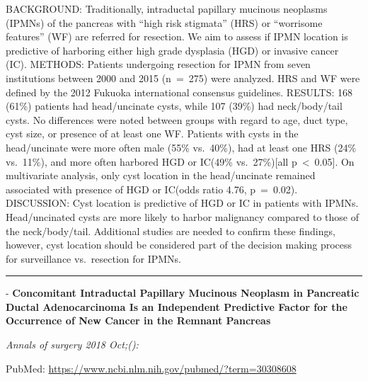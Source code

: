 \documentclass[]{article}
\begin{document}
BACKGROUND: Traditionally, intraductal papillary mucinous neoplasms
(IPMNs) of the pancreas with ``high risk stigmata'' (HRS) or ``worrisome
features'' (WF) are referred for resection. We aim to assess if IPMN
location is predictive of harboring either high grade dysplasia (HGD) or
invasive cancer (IC). METHODS: Patients undergoing resection for IPMN
from seven institutions between 2000 and 2015 (n~=~275) were analyzed.
HRS and WF were defined by the 2012 Fukuoka international consensus
guidelines. RESULTS: 168 (61\%) patients had head/uncinate cysts, while
107 (39\%) had neck/body/tail cysts. No differences were noted between
groups with regard to age, duct type, cyst size, or presence of at least
one WF. Patients with cysts in the head/uncinate were more often male
(55\% vs.~40\%), had at least one HRS (24\% vs.~11\%), and more often
harbored HGD or IC(49\% vs.~27\%){[}all p~\textless{}~0.05{]}. On
multivariate analysis, only cyst location in the head/uncinate remained
associated with presence of HGD or IC(odds ratio 4.76, p~=~0.02).
DISCUSSION: Cyst location is predictive of HGD or IC in patients with
IPMNs. Head/uncinated cysts are more likely to harbor malignancy
compared to those of the neck/body/tail. Additional studies are needed
to confirm these findings, however, cyst location should be considered
part of the decision making process for surveillance vs.~resection for
IPMNs.

{}

{}

\begin{center}\rule{0.5\linewidth}{\linethickness}\end{center}

 - \textbf{Concomitant Intraductal Papillary Mucinous Neoplasm in
Pancreatic Ductal Adenocarcinoma Is an Independent Predictive Factor for
the Occurrence of New Cancer in the Remnant Pancreas}

\emph{Annals of surgery 2018 Oct;():}

PubMed: \url{https://www.ncbi.nlm.nih.gov/pubmed/?term=30308608}
\end{document}
